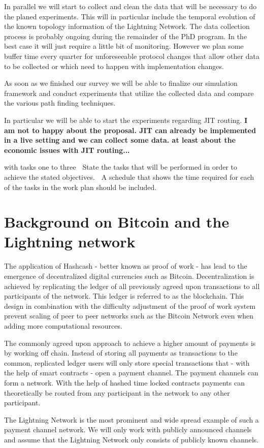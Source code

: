 \documentclass[a4paper]{paper}
\begin{document}
In parallel we will start to collect and clean the data that will be necessary to do the planed experiments.
This will in particular include the temporal evolution of the known topology information of the Lightning Network.
The data collection process is probably ongoing during the remainder of the PhD program.
In the best case it will just require a little bit of monitoring.
However we plan some buffer time every quarter for unforeseeable protocol changes that allow other data to be collected or which need to happen with implementation changes.

As soon as we finished our survey we will be able to finalize our simulation framework and conduct experiments that utilize the collected data and compare the various path finding techniques.

In particular we will be able to start the experiments regarding JIT routing. \textbf{I am not to happy about the proposal. JIT can already be implemented in a live setting and we can collect some data. at least about the economic issues with JIT routing...}

with tasks one to three
 State the tasks that will be performed in order to achieve the stated objectives.
 A schedule that shows the time required for each of the tasks in the work plan should be
included.




\appendix
\section{Background on Bitcoin and the Lightning network}
The application of Hashcash \cite{back2002hashcash} - better known as proof of work -  has lead to the emergence of decentralized digital currencies such as Bitcoin\cite{nakamoto2008bitcoin}.
Decentralization is achieved by replicating the ledger of all previously agreed upon transactions to all participants of the network.
This ledger is referred to as the blockchain.
This design in combination with the difficulty adjustment of the proof of work system prevent scaling of peer to peer networks such as the Bitcoin Network even when adding more computational resources.

The commonly agreed upon approach to achieve a higher amount of payments is by working off chain.
Instead of storing all payments as transactions to the common, replicated ledger users will only store special transactions that - with the help of smart contracts - open a payment channel.
The payment channels can form a network.
With the help of hashed time locked contracts payments can theoretically be routed from any participant in the network to any other participant. 

The Lightning Network is the most prominent and wide spread example of such a payment channel network.
We will only work with publicly announced channels and assume that the Lightning Network only consists of publicly known channels.
\end{document}
